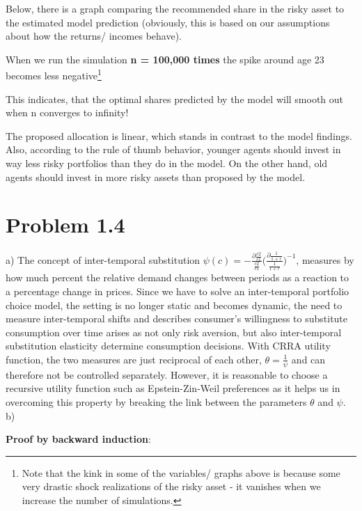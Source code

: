 \documentclass[12pt,a4paper]{article}
\begin{document}
Below, there is a graph comparing the recommended share in the risky asset to the estimated model prediction (obviously, this is based on our assumptions about how the returns/ incomes behave).

When we run the simulation \textbf{n = 100,000 times} the spike around age 23 becomes less negative\footnote{Note that the kink in some of the variables/ graphs above is because some very drastic shock realizations of the risky asset - it vanishes when we increase the number of simulations.}

This indicates, that the optimal shares predicted by the model will smooth out when n converges to infinity!

The proposed allocation is linear, which stands in contrast to the model findings. Also, according to the rule of thumb behavior, younger agents should invest in way less risky portfolios than they do in the model. On the other hand, old agents should invest in more risky assets than proposed by the model.

\section*{Problem 1.4}

a) The concept of inter-temporal substitution $\psi(c)=-\frac{\partial\frac{c2}{c1}}{\frac{c2}{c1}}\bigg(\frac{\partial\frac{1}{1+r}}{\frac{1}{1+r}}\bigg)^{-1}$, measures by how much percent the relative demand changes between periods as a reaction to a percentage change in prices. Since we have to solve an inter-temporal portfolio choice model, the setting is no longer static and becomes dynamic, the need to measure inter-temporal shifts and describes consumer's willingness to substitute consumption over time arises as not only risk aversion, but also inter-temporal substitution elasticity determine consumption decisions. With CRRA utility function, the two measures are just reciprocal of each other, $\theta=\frac{1}{\psi}$ and can therefore not be controlled separately. However, it is reasonable to choose a recursive utility function such as Epstein-Zin-Weil preferences as it helps us in overcoming this property by breaking the link between the parameters $\theta$ and $\psi$.    \\

b)

\textbf{Proof by backward induction}:
\end{document}
